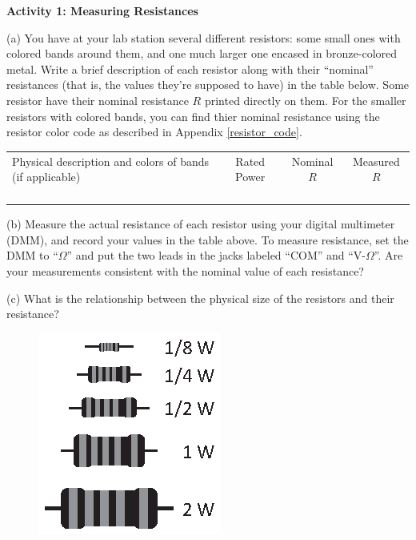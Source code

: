 \textbf{Activity 1: Measuring Resistances}

(a) You have at your lab station several different resistors: some small ones with colored bands around them, and one much larger one encased in bronze-colored metal.  Write a brief description of each resistor along with their ``nominal'' resistances (that is, the values they're supposed to have) in the table below.  Some resistor have their nominal resistance $R$ printed directly on them.  For the smaller resistors with colored bands, you can find thier nominal resistance using the resistor color code as described in Appendix \ref{resistor_code}.  

\begin{center}
{\renewcommand{\arraystretch}{2.0}
\begin{tabular}{|C{3.8in}|c|c|c|} \hline 
Physical description and colors of bands (if applicable) & Rated Power & Nominal $R$ & Measured $R$\\ 
\hhline{|=|=|=|=|}
& & & \\ \hline 
& & & \\ \hline 
& & & \\ \hline 
& & & \\ \hline 
\end{tabular} }
\end{center}

(b) Measure the actual resistance of each resistor using your digital multimeter (DMM), and record your values in the table above.  To measure resistance, set the DMM to ``$\Omega$'' and put the two leads in the jacks labeled ``COM'' and ``V-$\Omega$''.  Are your measurements consistent with the nominal value of each resistance?
\answerspace{0.6in}

(c) What is the relationship between the physical size of the resistors and their resistance?
\vspace{0.8in}

\begin{figure}
    \vspace{-0.3 in}
    \includegraphics{electric_power/resistor_sizes.eps}
\end{figure}


